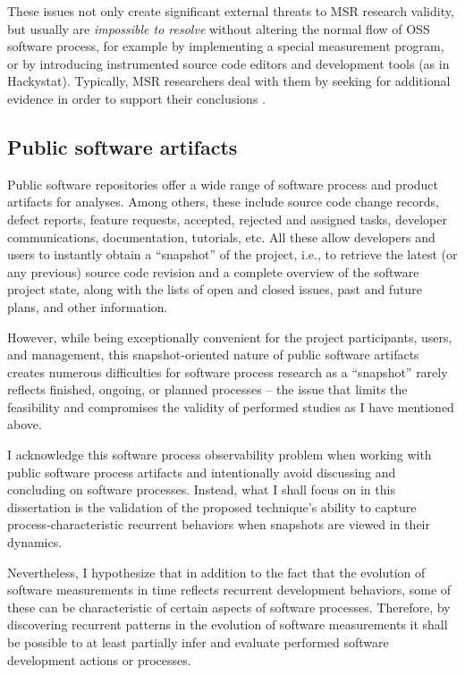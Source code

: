 These issues not only create significant external threats to MSR research validity, but usually are \textit{impossible to resolve}
without altering the normal flow of OSS software process, for example by implementing a special measurement program, 
or by introducing instrumented source code editors and development tools (as in Hackystat). 
Typically, MSR researchers deal with them by seeking for additional evidence in order to support their conclusions 
\cite{citeulike:5043664} \cite{citeulike:5128808}.

\subsection{Public software artifacts}
Public software repositories offer a wide range of software process and product artifacts for analyses.
Among others, these include source code change records, defect reports, feature requests, accepted, 
rejected and assigned tasks, developer communications, documentation, tutorials, etc. 
All these allow developers and users to instantly obtain a ``snapshot'' of the project, i.e., to retrieve the 
latest (or any previous) source code revision and a complete overview of the software project state,
along with the lists of open and closed issues, past and future plans, and other information.

However, while being exceptionally convenient for the project participants, users, and management, this 
snapshot-oriented nature of public software artifacts creates numerous difficulties for software process research 
as a ``snapshot'' rarely reflects finished, ongoing, or planned processes -- the issue that limits the feasibility and 
compromises the validity of performed studies as I have mentioned above. 

I acknowledge this software process observability problem when working with public software process artifacts 
and intentionally avoid discussing and concluding on software processes. Instead, what I shall focus on in this dissertation 
is the validation of the proposed technique's ability to capture process-characteristic recurrent behaviors when snapshots 
are viewed in their dynamics. 

Nevertheless, I hypothesize that in addition to the fact that the evolution of software measurements in time reflects 
recurrent development behaviors, some of these can be characteristic of certain aspects of software processes. 
Therefore, by discovering recurrent patterns in the evolution of software measurements it shall be possible to at least 
partially infer and evaluate performed software development actions or processes.

